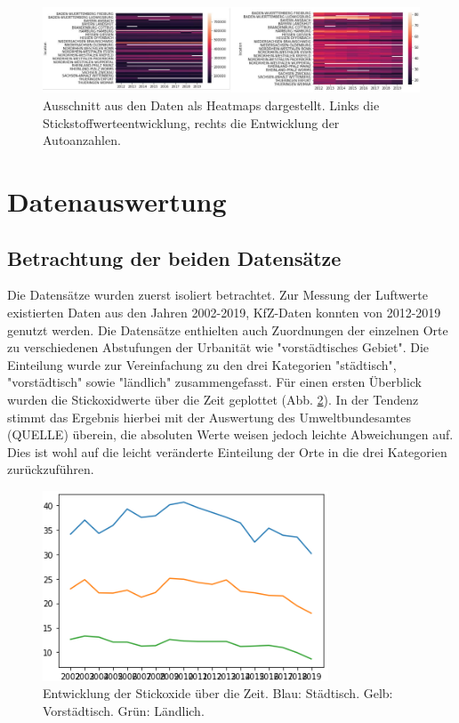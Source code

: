 \documentclass[11pt,a4paper,oneside,german]{article}
\begin{document}
	\begin{figure}[h!]
		\centering
		\includegraphics[width=12cm]{Heatmaps.png}
		\caption{Ausschnitt aus den Daten als Heatmaps dargestellt. Links die Stickstoffwerteentwicklung, rechts die Entwicklung der Autoanzahlen.}
		\label{fig:Heatmaps}
	\end{figure}
	
	\section{Datenauswertung}
	
	\subsection{Betrachtung der beiden Datensätze}
	
	Die Datensätze wurden zuerst isoliert betrachtet. Zur Messung der Luftwerte existierten Daten aus den Jahren 2002-2019, KfZ-Daten konnten von 2012-2019 genutzt werden. Die  Datensätze enthielten auch Zuordnungen der einzelnen Orte zu verschiedenen Abstufungen der Urbanität wie "vorstädtisches Gebiet". Die Einteilung wurde zur Vereinfachung zu den drei Kategorien "städtisch", "vorstädtisch" sowie "ländlich" zusammengefasst. Für einen ersten Überblick wurden die Stickoxidwerte über die Zeit geplottet (Abb. \ref{fig:NO2Entwicklung}). In der Tendenz stimmt das Ergebnis hierbei mit der Auswertung des Umweltbundesamtes (QUELLE) überein, die absoluten Werte weisen jedoch leichte Abweichungen auf. Dies ist wohl auf die leicht veränderte Einteilung der Orte in die drei Kategorien zurückzuführen.\\
	
	\begin{figure}[h!]
		\centering
		\includegraphics[width=8.5cm]{NO2Entwicklung.png}
		\caption{Entwicklung der Stickoxide über die Zeit. Blau: Städtisch. Gelb: Vorstädtisch. Grün: Ländlich.}
		\label{fig:NO2Entwicklung}
	\end{figure}
	
\end{document}
